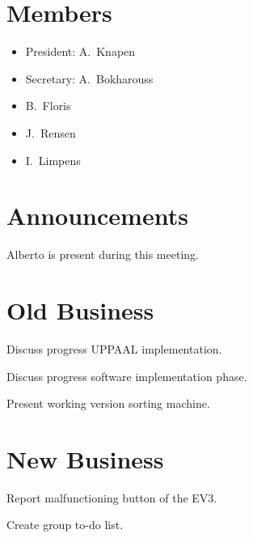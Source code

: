 \section{Members}
\begin{itemize}
	\item President: A.~Knapen
    \item Secretary: A.~Bokharouss
    \item B.~Floris
    \item J.~Rensen
    \item I.~Limpens
\end{itemize}

\section{Announcements}
\begin{items}
	\item Alberto is present during this meeting.
\end{items}


\section{Old Business}
\begin{items}
	\item Discuss progress UPPAAL implementation.
	\item Discuss progress software implementation phase.
    \item Present working version sorting machine.
\end{items}


\section{New Business}
\begin{items}
    \item Report malfunctioning button of the EV3.
    \item Create group to-do list.
\end{items}

\vspace{1em}
